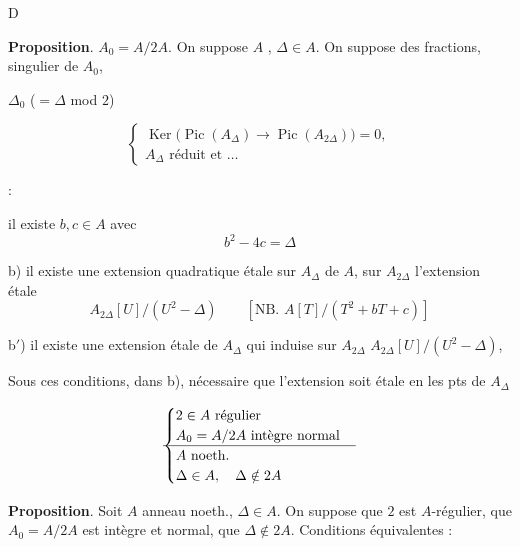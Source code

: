 \documentclass[11pt,a4paper]{article}
\begin{document}

D\ill{} \ill{} \ill{}

\textbf{Proposition}. $A_0=A/2A$. On suppose  $A$ \ill{} \ill{}, $\Delta\in A$. On suppose  \ill{} \ill{} des fractions, \ill{} \ill{} singulier de $A_0$, 

$\Delta_0$ ($=\Delta$ mod $2$) \ill{} \ill{} \ill{} \ill{}

\[
\begin{cases}
\operatorname{Ker}\bigl(\operatorname{Pic}(A_\Delta)\to\operatorname{Pic}(A_{2\Delta})\bigr)=0, \\
A_\Delta \text{ réduit et } \dots
\end{cases}
\]

   \ill{}  :

 il existe $b,c\in A$ avec
\[
b^2-4c=\Delta
\]

 b) il existe une extension quadratique étale sur $A_\Delta$ de $A$,  sur $A_{2\Delta}$  l'extension étale
\[
A_{2\Delta}[U]/(U^2-\Delta)\qquad [\text{NB. } A[T]/(T^2+bT+c)]
\]

b$'$) il existe une extension  étale de $A_\Delta$ qui induise sur \struck{\ill{}} $A_{2\Delta}$ \add{\ill{}} \ill{} $A_{2\Delta}[U]/(U^2-\Delta)$,


Sous ces conditions, dans b), \ill{} \ill{} nécessaire que l'extension soit étale en les pts de $A_\Delta$

\[
\text{\struck{$\begin{cases} 2\in A \text{ régulier} \\ A_0=A/2A \text{ intègre normal} \\ A \text{ noeth.} \\ \Delta\in A,\quad \Delta\notin 2A \end{cases}$}}
\]

\textbf{Proposition}. Soit $A$ anneau noeth., $\Delta\in A$. On suppose que $2$ est $A$-régulier, que $A_0=A/2A$ est intègre et normal, que $\Delta\notin 2A$. Conditions équivalentes :
\end{document}
